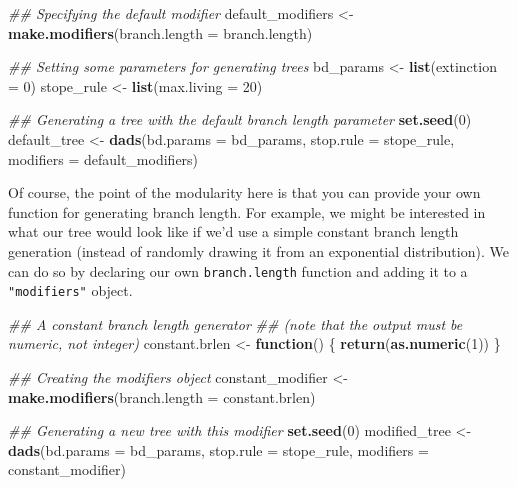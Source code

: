 \documentclass[]{book}
\newenvironment{Shaded}{\begin{snugshade}}{\end{snugshade}}
\newcommand{\CommentTok}[1]{\textcolor[rgb]{0.56,0.35,0.01}{\textit{#1}}}
\newcommand{\ControlFlowTok}[1]{\textcolor[rgb]{0.13,0.29,0.53}{\textbf{#1}}}
\newcommand{\DataTypeTok}[1]{\textcolor[rgb]{0.13,0.29,0.53}{#1}}
\newcommand{\DecValTok}[1]{\textcolor[rgb]{0.00,0.00,0.81}{#1}}
\newcommand{\KeywordTok}[1]{\textcolor[rgb]{0.13,0.29,0.53}{\textbf{#1}}}
\newcommand{\NormalTok}[1]{#1}
\newcommand{\StringTok}[1]{\textcolor[rgb]{0.31,0.60,0.02}{#1}}
\begin{document}
\begin{Shaded}
\begin{Highlighting}[]
\CommentTok{## Specifying the default modifier}
\NormalTok{default_modifiers <-}\StringTok{ }\KeywordTok{make.modifiers}\NormalTok{(}\DataTypeTok{branch.length =}\NormalTok{ branch.length)}

\CommentTok{## Setting some parameters for generating trees}
\NormalTok{bd_params  <-}\StringTok{ }\KeywordTok{list}\NormalTok{(}\DataTypeTok{extinction =} \DecValTok{0}\NormalTok{)}
\NormalTok{stope_rule <-}\StringTok{ }\KeywordTok{list}\NormalTok{(}\DataTypeTok{max.living =} \DecValTok{20}\NormalTok{)}

\CommentTok{## Generating a tree with the default branch length parameter}
\KeywordTok{set.seed}\NormalTok{(}\DecValTok{0}\NormalTok{)}
\NormalTok{default_tree <-}\StringTok{ }\KeywordTok{dads}\NormalTok{(}\DataTypeTok{bd.params =}\NormalTok{ bd_params,}
                     \DataTypeTok{stop.rule =}\NormalTok{ stope_rule,}
                     \DataTypeTok{modifiers =}\NormalTok{ default_modifiers)}
\end{Highlighting}
\end{Shaded}

Of course, the point of the modularity here is that you can provide your own function for generating branch length.
For example, we might be interested in what our tree would look like if we'd use a simple constant branch length generation (instead of randomly drawing it from an exponential distribution).
We can do so by declaring our own \texttt{branch.length} function and adding it to a \texttt{"modifiers"} object.

\begin{Shaded}
\begin{Highlighting}[]
\CommentTok{## A constant branch length generator}
\CommentTok{## (note that the output must be numeric, not integer)}
\NormalTok{constant.brlen <-}\StringTok{ }\ControlFlowTok{function}\NormalTok{() \{}
    \KeywordTok{return}\NormalTok{(}\KeywordTok{as.numeric}\NormalTok{(}\DecValTok{1}\NormalTok{))}
\NormalTok{\}}

\CommentTok{## Creating the modifiers object}
\NormalTok{constant_modifier <-}\StringTok{ }\KeywordTok{make.modifiers}\NormalTok{(}\DataTypeTok{branch.length =}\NormalTok{ constant.brlen)}

\CommentTok{## Generating a new tree with this modifier}
\KeywordTok{set.seed}\NormalTok{(}\DecValTok{0}\NormalTok{)}
\NormalTok{modified_tree <-}\StringTok{ }\KeywordTok{dads}\NormalTok{(}\DataTypeTok{bd.params =}\NormalTok{ bd_params,}
                      \DataTypeTok{stop.rule =}\NormalTok{ stope_rule,}
                      \DataTypeTok{modifiers =}\NormalTok{ constant_modifier)}
\end{Highlighting}
\end{Shaded}
\end{document}
